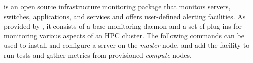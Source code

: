 \Nagios{} is an open source infrastructure monitoring package that monitors
servers, switches, applications, and services and offers user-defined alerting
facilities. As provided by \FSP{}, it consists of a base monitoring daemon and
a set of plug-ins for monitoring various aspects of an HPC cluster.  The
following commands can be used to install and configure a \Nagios{} server on the {\em
master} node, and add the facility to run tests and gather metrics from
provisioned {\em compute} nodes.
